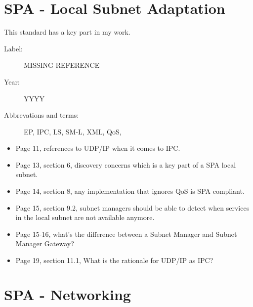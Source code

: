 \section{SPA - Local Subnet Adaptation}

This standard has a key part in my work.

\begin{description}
    \item[Label:] MISSING REFERENCE %
    \item[Year:] YYYY
    \item[Abbrevations and terms:]
        EP,
        IPC,
        LS,
        SM-L,
        XML,
        QoS,
\end{description}

\begin{itemize}
    \item Page 11, references to UDP/IP when it comes to IPC.
    \item Page 13, section 6, discovery concerns which is a key part of a SPA
        local subnet.
    \item Page 14, section 8, any implementation that ignores QoS is SPA
        compliant.
    \item Page 15, section 9.2, subnet managers should be able to detect when
        services in the local subnet are not available anymore.
    \item Page 15-16, what's the difference between a Subnet Manager and Subnet
        Manager Gateway?
    \item Page 19, section 11.1, What is the rationale for UDP/IP as IPC?
\end{itemize}

\section{SPA - Networking}

